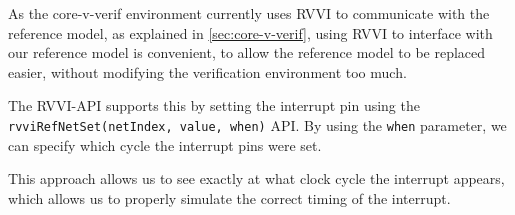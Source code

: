 As the core-v-verif environment currently uses RVVI to communicate with the reference model, as explained in \cref{sec:core-v-verif}, using RVVI to interface with our reference model is convenient, to allow the reference model to be replaced easier, without modifying the verification environment too much.

The RVVI-API supports this by setting the interrupt pin using the \lstinline{rvviRefNetSet(netIndex, value, when)} API. By using the \lstinline{when} parameter, we can specify which cycle the interrupt pins were set.

This approach allows us to see exactly at what clock cycle the interrupt appears, which allows us to properly simulate the correct timing of the interrupt.

%
%



%
%
%




%

%


